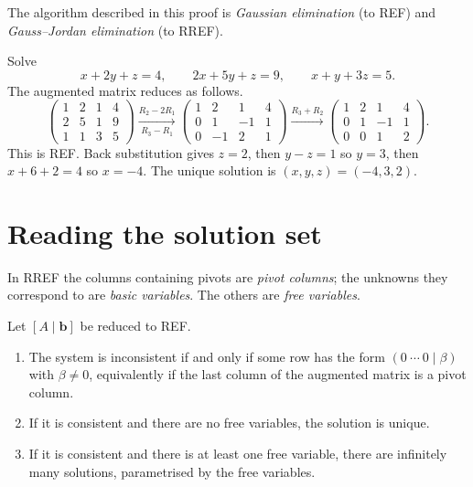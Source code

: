 The algorithm described in this proof is \emph{Gaussian elimination} (to REF) and \emph{Gauss--Jordan elimination} (to RREF).

\begin{example}\label{ex:gauss}
Solve
\[ x+2y+z=4,\qquad 2x+5y+z=9,\qquad x+y+3z=5. \]
The augmented matrix reduces as follows.
\[
\begin{pmatrix}1&2&1&4\\2&5&1&9\\1&1&3&5\end{pmatrix}
\xrightarrow[R_3-R_1]{R_2-2R_1}
\begin{pmatrix}1&2&1&4\\0&1&-1&1\\0&-1&2&1\end{pmatrix}
\xrightarrow{R_3+R_2}
\begin{pmatrix}1&2&1&4\\0&1&-1&1\\0&0&1&2\end{pmatrix}.
\]
This is REF. Back substitution gives $z=2$, then $y-z=1$ so $y=3$, then $x+6+2=4$ so $x=-4$. The unique solution is $(x,y,z)=(-4,3,2)$.
\end{example}

\section{Reading the solution set}

In RREF the columns containing pivots are \emph{pivot columns}; the unknowns they correspond to are \emph{basic variables}. The others are \emph{free variables}.

\begin{theorem}\label{thm:struct}
Let $[A\mid\mathbf{b}]$ be reduced to REF.
\begin{enumerate}[label=(\roman*)]
  \item The system is inconsistent if and only if some row has the form $(0\ \cdots\ 0\mid\beta)$ with $\beta\ne0$, equivalently if the last column of the augmented matrix is a pivot column.
  \item If it is consistent and there are no free variables, the solution is unique.
  \item If it is consistent and there is at least one free variable, there are infinitely many solutions, parametrised by the free variables.
\end{enumerate}
\end{theorem}

